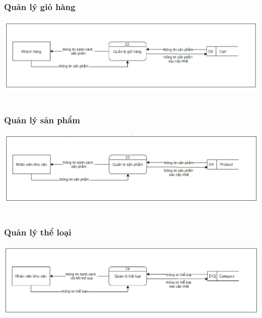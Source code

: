 \documentclass[12pt,a4paper,2sides]{report}
\begin{document}
\subsubsection{Quản lý giỏ hàng}
    \includegraphics[width=1\linewidth]{lib/DFD/quanlygiohang.png}\\\vspace*{1cm}    
    \hspace{5cm}{Hình 18. Quản lý giỏ hàng}\\
\subsubsection{Quản lý sản phẩm}
    \includegraphics[width=1\linewidth]{lib/DFD/quanlysp.png}\\\vspace*{1cm}  
    \hspace{5cm}{Hình 19. Quản lý sản phẩm}\\
\subsubsection{Quản lý thể loại}
    \includegraphics[width=1\linewidth]{lib/DFD/quanlytheloai.png}\\\vspace*{1cm} 
    \hspace{5cm}{Hình 20. Quản lý thể loại}\\
\end{document}
